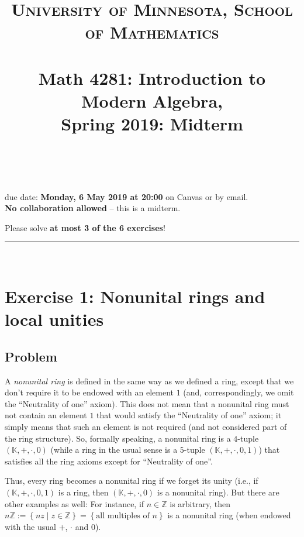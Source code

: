 \documentclass[paper=a4, fontsize=12pt]{scrartcl} %
\title{	
\normalfont \normalsize 
\textsc{University of Minnesota, School of Mathematics} \\ [25pt] %
\horrule{0.5pt} \\[0.4cm] %
\huge Math 4281: Introduction to Modern Algebra, \\
Spring 2019:
Midterm \psetnumber\\%
\horrule{2pt} \\[0.5cm] %
}
\author{\myname}
\newcommand{\KK}{\mathbb{K}} %
\newcommand{\ZZ}{\mathbb{Z}} %
\newcommand{\set}[1]{\left\{ #1 \right\}}
\newcommand{\tup}[1]{\left( #1 \right)}
\newcommand{\horrule}[1]{\rule{\linewidth}{#1}} %
\theoremstyle{plainsl}
\theoremstyle{definition}
\theoremstyle{remark}
\begin{document}
\maketitle %

\begin{center} %
{\large due date: \textbf{Monday, 6 May 2019 at 20:00} on Canvas or by email. \\

\textbf{No collaboration allowed} -- this is a midterm.

Please solve \textbf{at most 3 of the 6 exercises}!}
\end{center}

\horrule{0.3pt} \\[0.4cm]

\section{Exercise 1: Nonunital rings and local unities}

\subsection{Problem}

A \textit{nonunital ring} is defined in the same way as we defined a ring,
except that we don't require it to be endowed with an element $1$ (and,
correspondingly, we omit the ``Neutrality of one'' axiom).
This does not mean that a nonunital ring must not contain an element $1$
that would satisfy the ``Neutrality of one'' axiom; it simply means that
such an element is not required (and not considered part of the ring
structure).
So, formally speaking, a nonunital ring is a
$4$-tuple $\tup{\KK, +, \cdot, 0}$
(while a ring in the usual sense is a $5$-tuple
$\tup{\KK, +, \cdot, 0, 1}$)
that satisfies all the ring axioms except for ``Neutrality of one''.

Thus, every ring becomes a nonunital ring if we forget its unity (i.e., if
$\tup{\KK, +, \cdot, 0, 1}$ is a ring, then $\tup{\KK, +, \cdot, 0}$
is a nonunital ring).
But there are other examples as well:
For instance, if $n \in \ZZ$ is arbitrary, then
$n \ZZ := \set{ nz \mid z \in \ZZ }
= \set{ \text{all multiples of } n }$ is a nonunital ring
(when endowed with the usual $+$, $\cdot$ and $0$).
\end{document}
